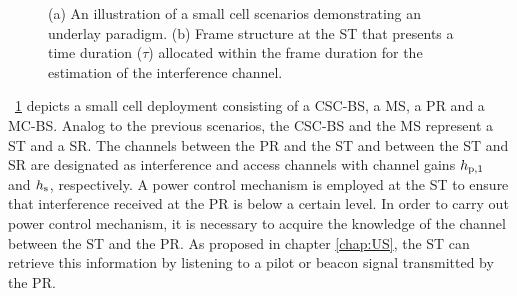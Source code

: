 \begin{figure}
	\centering
	\caption{(a) An illustration of a small cell scenarios demonstrating an underlay paradigm. (b) Frame structure at the ST that presents a time duration ($\tau$) allocated within the frame duration for the estimation of the interference channel.} 
	\label{szenarioA}
\end{figure}



\figurename~\ref{szenarioA} depicts a small cell deployment consisting of a CSC-BS, a MS, a PR and a MC-BS. Analog to the previous scenarios, the CSC-BS and the MS represent a ST and a SR. The channels between the PR and the ST and between the ST and SR are designated as interference and access channels with channel gains $h_{\text{p,1}}$ and $h_{\text{s}}$, respectively. A power control mechanism is employed at the ST to ensure that interference received at the PR is below a certain level. In order to carry out power control mechanism, it is necessary to acquire the knowledge of the channel between the ST and the PR. As proposed in chapter \ref{chap:US}, the ST can retrieve this information by listening to a pilot or beacon signal transmitted by the PR. %


